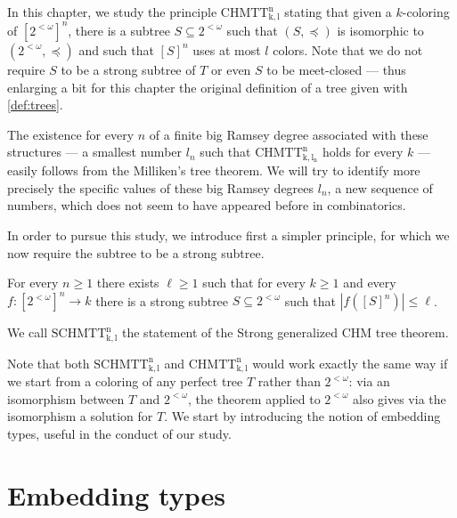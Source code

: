 


In this chapter, we study the principle $\mathrm{CHMTT^n_{k,l}}$ stating that given a $k$-coloring of $[2^{<\omega}]^n$, there is a subtree $S\subseteq 2^{<\omega}$ such that $(S, \preceq)$ is isomorphic to $(2^{<\omega}, \preceq)$ and such that $[S]^n$ uses at most $l$ colors. Note that we do not require $S$ to be a strong subtree of $T$ or even $S$ to be meet-closed --- thus enlarging a bit for this chapter the original definition of a tree given with \cref{def:trees}. 

The existence for every $n$ of a finite big Ramsey degree associated with these structures --- a smallest number $l_n$ such that $\mathrm{CHMTT^n_{k,l_n}}$ holds for every $k$ --- easily follows from the Milliken's tree theorem. We will try to identify more precisely the specific values of these big Ramsey degrees $l_n$, a new sequence of numbers, which does not seem to have appeared before in combinatorics.

In order to pursue this study, we introduce first a simpler principle, for which we now require the subtree to be a strong subtree.

\begin{theorem}
For every $n \geq 1$ there exists $\ell \geq 1$ such that for every $k \geq 1$ and every $f: [2^{<\omega}]^n \to k$ there is a strong subtree $S \subseteq 2^{<\omega}$ such that $|f ([S]^n)| \leq \ell$. 
\end{theorem}
\begin{statement}
  We call $\mathrm{SCHMTT^n_{k,l}}$ the statement of the Strong generalized CHM tree theorem.
\end{statement}

Note that both $\mathrm{SCHMTT^n_{k,l}}$ and $\mathrm{CHMTT^n_{k,l}}$ would work exactly the same way if we start from a coloring of any perfect tree $T$ rather than $2^{<\omega}$: via an isomorphism between $T$ and $2^{<\omega}$, the theorem applied to $2^{<\omega}$ also gives via the isomorphism a solution for $T$. We start by introducing the notion of embedding types, useful in the conduct of our study.

\section{Embedding types}

